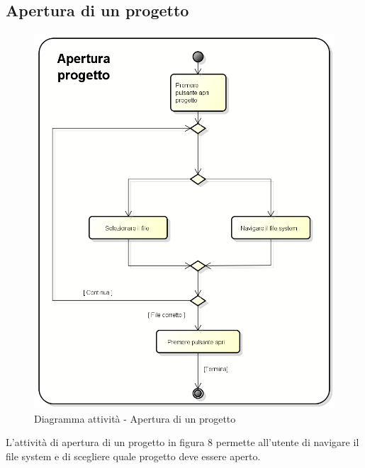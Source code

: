 \subsection{Apertura di un progetto}
\begin{figure}[h] 
	\centering 
	\includegraphics[scale=0.3] {img/Activity_apertura.png} 
	\caption{Diagramma attività - Apertura di un progetto} 
\end{figure}
L'attività di apertura di un progetto in figura 8 permette all'utente di navigare il file system e di scegliere quale progetto deve essere aperto.
\newpage

